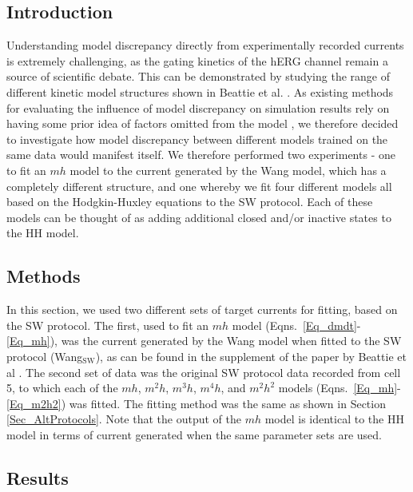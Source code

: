 \documentclass[11pt,a4paper,oneside]{article}
\begin{document}
\subsection{Introduction}
Understanding model discrepancy directly from experimentally recorded currents is extremely challenging, as the gating kinetics of the hERG channel remain a source of scientific debate. This can be demonstrated by studying the range of different kinetic model structures shown in Beattie et al. \cite{Beattie2018}. As existing methods for evaluating the influence of model discrepancy on simulation results rely on having some prior idea of factors omitted from the model \cite{Strong2014}, we therefore decided to investigate how model discrepancy between different models trained on the same data would manifest itself. We therefore performed two experiments - one to fit an $mh$ model to the current generated by the Wang model, which has a completely different structure, and one whereby we fit four different models all based on the Hodgkin-Huxley equations to the SW protocol. Each of these models can be thought of as adding additional closed and/or inactive states to the HH model. 

\subsection{Methods}
In this section, we used two different sets of target currents for fitting, based on the SW protocol. The first, used to fit an $mh$ model (Eqns.~\eqref{Eq_dmdt}-\eqref{Eq_mh}), was the current generated by the Wang model when fitted to the SW protocol (Wang$_\text{SW}$), as can be found in the supplement of the paper by Beattie et al \cite{Beattie2018}. The second set of data was the original SW protocol data recorded from cell 5, to which each of the $mh$, $m^2h$, $m^3h$, $m^4h$, and $m^2h^2$ models (Eqns.~\eqref{Eq_mh}-\eqref{Eq_m2h2}) was fitted. The fitting method was the same as shown in Section \ref{Sec_AltProtocols}. Note that the output of the $mh$ model is identical to the HH model in terms of current generated when the same parameter sets are used.

\subsection{Results}
\end{document}
